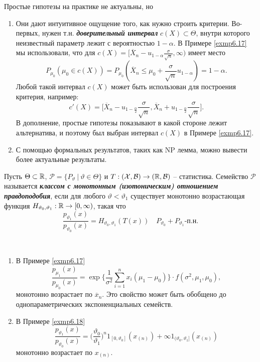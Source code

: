 \begin{rmrk}
	Простые гипотезы на практике не актуальны, но
	\begin{enumerate}
		\item Они дают интуитивное ощущение того, как нужно строить критерии. Во-первых, нужен т.н. \textbf{\textit{доверительный интервал}} $c(X) \subset \Theta$, внутри которого неизвестный параметр лежит с вероятностью $1-\alpha$. В Примере \ref{exmp6.17} мы использовали, что для $c(X)=[\overline{X}_n -u_{1 - \alpha} \frac{\sigma}{\sqrt{n}}, \infty)$ имеет место
		\[P_{\mu_0}(\mu_0 \in c(X)) = P_{\mu_0}(\overline{X}_n \leq \mu_0 + \frac{\sigma}{\sqrt{n}} u_{1-\alpha}) = 1-\alpha. \]
		Любой такой интервал  $c(X)$ может быть использован для построения критерия, например:
		\[c'(X) =\Big[\overline{X}_n -u_{1-\frac{\alpha}{2}} \frac{\sigma}{\sqrt{n}}, \overline{X}_n + u_{1-\frac{\alpha}{2}} \frac{\sigma}{\sqrt{n}} \Big].\]
		В дополнение, простые гипотезы показывают в какой стороне лежит альтернатива, и поэтому был выбран интервал $c(X)$ в Примере \ref{exmp6.17}.
		\item С помощью формальных результатов, таких как NP лемма, можно вывести более актуальные результаты.
	\end{enumerate}
\end{rmrk}

\begin{defn}
	Пусть $\Theta \subset \mathbb{R}$, $\mathcal{P} = \{P_\vartheta\ |\ \vartheta \in \Theta \}$ и $T:(\mathcal{X},\mathcal{B}) \rightarrow (\mathbb{R},\mathcal{B})$ -- статистика. Семейство $\mathcal{P}$ называется \textbf{\textit{классом с монотонным (изотоническим) отношением правдоподобия}}, если для любого $\vartheta < \vartheta_1$ существует монотонно возрастающая функция $H_{\vartheta_0, \vartheta_1}: \mathbb{R} \rightarrow [0, \infty)$, такая что
	\[\frac{p_{\vartheta_1}(x)}{p_{\vartheta_0}(x)} =H_{\vartheta_0, \vartheta_1}(T(x)) \quad P_{\vartheta_0} + P_{\vartheta_1}\text{-п.н.} \]
\end{defn}

\begin{exmp} \
	\begin{enumerate}
		\item В Примере \ref{exmp6.17}
		\[ \frac{p_{\mu_1}(x)}{p_{\mu_0}(x)} = \exp \Big \{ \frac{1}{\sigma^2} \sum_{i=1}^{n} x_i(\mu_1 - \mu_0) \Big \} \cdot f(\sigma^2, \mu_1, \mu_0),  \]
		монотонно возрастает по $\overline{x}_n$. Это свойство может быть обобщено до однопараметрических экспоненциальных семейств.
		\item В Примере \ref{exmp6.18}
		\[ \frac{p_{\vartheta_1}(x)}{p_{\vartheta_0}(x)} = \Big( \frac{\vartheta_0}{\vartheta_1} \Big)^n 1_{[0, \vartheta_0]}(x_{(n)}) + \infty 1_{(\vartheta_0, \vartheta_1]}(x_{(n)}) \]
		монотонно возрастает по $x_{(n)}$.
	\end{enumerate}
\end{exmp}


